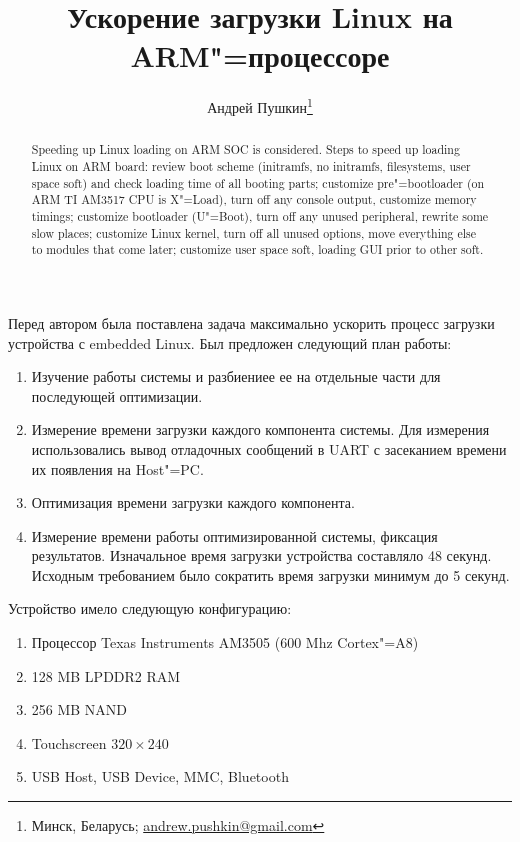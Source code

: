 \documentclass[10pt, a5paper]{article}
\begin{document}
\title{Ускорение загрузки Linux на ARM"=процессоре}%

\author{Андрей Пушкин\footnote{Минск, Беларусь; \url{andrew.pushkin@gmail.com}}}
\maketitle

\begin{abstract}
Speeding up Linux loading on ARM SOC is considered. Steps to speed up loading Linux on ARM board: review boot scheme (initramfs, no initramfs, filesystems, user space soft) and check loading time of all booting parts; customize pre"=bootloader (on ARM TI AM3517 CPU is X"=Load), turn off any console output, customize memory timings; customize bootloader (U"=Boot), turn off any unused peripheral, rewrite some slow places; customize Linux kernel, turn off all unused options, move everything else to modules that come later; customize user space soft, loading GUI prior to other soft.
\end{abstract}

Перед автором была поставлена задача максимально ускорить процесс загрузки устройства с embedded Linux. Был предложен следующий план работы:

\begin{enumerate}
  \item Изучение работы системы и разбиениее ее на отдельные части для последующей оптимизации.
  \item Измерение времени загрузки каждого компонента системы. Для измерения использовались вывод отладочных сообщений в UART с засеканием времени их появления на Host"=PC.
  \item Оптимизация времени загрузки каждого компонента.
  \item Измерение времени работы оптимизированной системы, фиксация результатов.
Изначальное время загрузки устройства составляло 48 секунд. Исходным требованием было сократить время загрузки минимум до 5 секунд.
\end{enumerate}

Устройство имело следующую конфигурацию:

\begin{enumerate}
  \item Процессор Texas Instruments AM3505 (600 Mhz Cortex"=A8)
  \item 128 MB LPDDR2 RAM
  \item 256 MB NAND
  \item Touchscreen $320\times240$
  \item USB Host, USB Device, MMC, Bluetooth
\end{enumerate}
\end{document}
